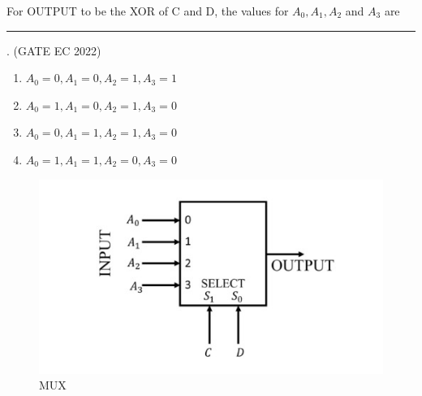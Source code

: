 \begin{enumerate}[label=\arabic*.,ref=\theenumi]
	  For OUTPUT to be the XOR of C and D, the values for $A_0,A_1,A_2$ and $A_3$  are  \rule{1cm}{0.1pt}. \hfill(GATE EC 2022)
	 \begin{enumerate}
		\item $A_0=0,A_1=0,A_2=1,A_3=1$
		\item $A_0=1,A_1=0,A_2=1,A_3=0$
		\item $A_0=0,A_1=1,A_2=1,A_3=0$
		\item $A_0=1,A_1=1,A_2=0,A_3=0$
	\end{enumerate}
	 \begin{figure}[H]
		 \centering
		\includegraphics[width=0.5\columnwidth]{figs/gatepic19.jpg}
		\caption{MUX}
		 \label{fig:MUX}
	\end{figure}

\end{enumerate}




